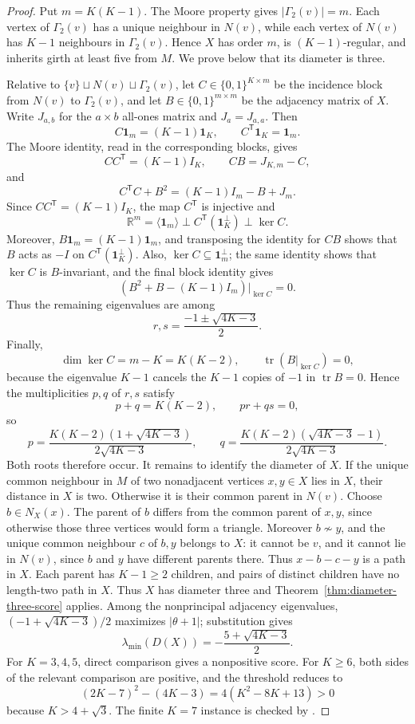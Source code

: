 \documentclass[a4paper,10pt,reqno]{amsart}
\theoremstyle{plain}
\theoremstyle{definition}
\theoremstyle{remark}
\newcommand{\one}{\mathbf 1}
\newcommand{\tr}{\operatorname{tr}}
\newcommand{\RepoTag}{v2.2.8}
\newcommand{\codefile}[1]{%
  \href{https://github.com/SamPetkov/wow284/blob/\RepoTag/#1}{\path{#1}}}
\begin{document}
\begin{proof}
Put \(m=K(K-1)\).  The Moore property gives
\(\lvert\Gamma_2(v)\rvert=m\).  Each vertex of \(\Gamma_2(v)\) has a unique
neighbour in \(N(v)\), while each vertex of \(N(v)\) has \(K-1\) neighbours
in \(\Gamma_2(v)\).  Hence \(X\) has order \(m\), is
\((K-1)\)-regular, and inherits girth at least five from \(M\).  We prove
below that its diameter is three.

Relative to \(\{v\}\sqcup N(v)\sqcup\Gamma_2(v)\), let
\(C\in\{0,1\}^{K\times m}\) be the incidence block from \(N(v)\) to
\(\Gamma_2(v)\), and let \(B\in\{0,1\}^{m\times m}\) be the adjacency
matrix of \(X\).  Write \(J_{a,b}\) for the \(a\times b\) all-ones matrix
and \(J_a=J_{a,a}\).  Then
\[
 C\one_m=(K-1)\one_K,
 \qquad
 C^{\mathsf T}\one_K=\one_m.
\]
The Moore identity, read in the corresponding blocks, gives
\[
 CC^{\mathsf T}=(K-1)I_K,
 \qquad
 CB=J_{K,m}-C,
\]
and
\[
 C^{\mathsf T}C+B^2=(K-1)I_m-B+J_m.
\]
Since \(CC^{\mathsf T}=(K-1)I_K\), the map \(C^{\mathsf T}\) is
injective and
\[
 \mathbb R^m
 =\langle\one_m\rangle\perp
 C^{\mathsf T}(\one_K^\perp)\perp\ker C.
\]
Moreover, \(B\one_m=(K-1)\one_m\), and transposing the identity for
\(CB\) shows that \(B\) acts as \(-I\) on
\(C^{\mathsf T}(\one_K^\perp)\).  Also,
\(\ker C\subseteq\one_m^\perp\); the same identity shows that
\(\ker C\) is \(B\)-invariant, and the final block identity gives
\[
 (B^2+B-(K-1)I_m)|_{\ker C}=0.
\]
Thus the remaining eigenvalues are among
\[
 r,s=\frac{-1\pm\sqrt{4K-3}}2.
\]
Finally,
\[
 \dim\ker C=m-K=K(K-2),
 \qquad
 \tr(B|_{\ker C})=0,
\]
because the eigenvalue \(K-1\) cancels the \(K-1\) copies of \(-1\)
in \(\tr B=0\).  Hence the multiplicities \(p,q\) of \(r,s\) satisfy
\[
 p+q=K(K-2),\qquad pr+qs=0,
\]
so
\[
 p=\frac{K(K-2)(1+\sqrt{4K-3})}{2\sqrt{4K-3}},
 \qquad
 q=\frac{K(K-2)(\sqrt{4K-3}-1)}{2\sqrt{4K-3}}.
\]
Both roots therefore occur.  It remains to identify the
diameter of \(X\).  If the unique common neighbour in \(M\) of two
nonadjacent vertices \(x,y\in X\) lies in \(X\), their distance in \(X\)
is two.  Otherwise it is their common parent in \(N(v)\).  Choose
\(b\in N_X(x)\).  The parent of \(b\) differs from the common parent of
\(x,y\), since otherwise those three vertices would form a triangle.
Moreover \(b\not\sim y\), and the unique common neighbour
\(c\) of \(b,y\) belongs to \(X\): it cannot be \(v\), and it cannot
lie in \(N(v)\), since \(b\) and \(y\) have different parents there.
Thus \(x-b-c-y\) is a path in \(X\).  Each parent has \(K-1\ge2\)
children, and pairs of distinct children have no length-two path in \(X\).
Thus \(X\) has diameter three and
Theorem~\ref{thm:diameter-three-score} applies.  Among the nonprincipal
adjacency eigenvalues, \((-1+\sqrt{4K-3})/2\) maximizes
\(|\theta+1|\); substitution gives
\[
 \lambda_{\min}(D(X))=-\frac{5+\sqrt{4K-3}}2.
\]
For \(K=3,4,5\), direct comparison gives a nonpositive score.  For
\(K\ge6\), both sides of the relevant comparison are positive, and the
threshold reduces to
\[
 (2K-7)^2-(4K-3)=4(K^2-8K+13)>0
\]
because \(K>4+\sqrt3\).  The finite \(K=7\) instance is checked by
\codefile{scripts/verify_wow284_38_40_42.py}.
\end{proof}
\end{document}
